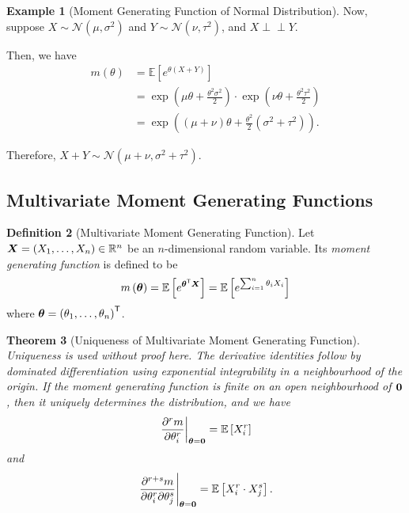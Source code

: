\documentclass[11pt]{article}
\numberwithin{equation}{section}
\newtheorem{theorem}{Theorem}[section]
\theoremstyle{definition}
\newtheorem{definition}[theorem]{Definition}
\newtheorem{example}[theorem]{Example}
\theoremstyle{remark}
\newcommand{\pqty}[1]{\left(#1\right)}
\newcommand{\bqty}[1]{\left[#1\right]}
\newcommand{\RR}{\mathbb R}
\newcommand{\transpose}{^{\mathsf T}}
\newcommand{\rightbar}[1]{\left.#1\right|}
\newcommand{\Expt}{\mathbb E}
\newcommand{\indp}{\mathrel{\perp\!\!\!\perp}}
\newcommand{\Normal}{\mathcal N}
\begin{document}
\begin{example}[Moment Generating Function of Normal Distribution]
    Now, suppose \(X \sim \Normal\pqty{\mu, \sigma^2}\) and \(Y \sim \Normal\pqty{\nu, \tau^2}\), and \(X \indp Y\).

    Then, we have
    \begin{align*}
        m\pqty{\theta} &= \Expt\bqty{e^{\theta \pqty{X + Y}}} \\
        &= \exp\pqty{\mu \theta + \frac{\theta^2 \sigma^2}{2}} \cdot \exp\pqty{\nu \theta + \frac{\theta^2 \tau^2}{2}} \\
        &= \exp\pqty{\pqty{\mu + \nu} \theta + \frac{\theta^2}{2} \pqty{\sigma^2 + \tau^2}}.
    \end{align*}

    Therefore, \(X + Y \sim \Normal\pqty{\mu + \nu, \sigma^2 + \tau^2}\).
\end{example}

\subsection{Multivariate Moment Generating Functions}

\begin{definition}[Multivariate Moment Generating Function]\label{probability-definition-065}
    \label{probability-def:multivariate-mgf}%
    Let \(\vb{X} = \pqty{X_1, \ldots, X_n} \in \RR^n\) be an \(n\)-dimensional random variable. Its \emph{moment generating function} is defined to be
    \[
        m\pqty{\vb*{\theta}} = \Expt\bqty{e^{\vb*{\theta}\transpose \vb{X}}} = \Expt\bqty{e^{\sum_{i = 1}^{n} \theta_i X_i}}
    \]
    where \(\vb*{\theta} = \pqty{\theta_1, \ldots, \theta_n} \transpose\).
\end{definition}

\begin{theorem}[Uniqueness of Multivariate Moment Generating Function]\label{probability-theorem-024}
    \label{probability-thm:uniqueness-multivarite-mgf-moments}
Uniqueness is used without proof here. The derivative identities follow by dominated differentiation using exponential integrability in a neighbourhood of the origin.
%
    If the moment generating function is finite on an open neighbourhood of \(\vb{0}\), then it uniquely determines the distribution, and we have
    \[
        \rightbar{\pdv[r]{m}{\theta_i}}_{\vb*{\theta} = \vb{0}} = \Expt\bqty{X_i^r}
    \]
    and
    \[
        \rightbar{\frac{\partial^{r + s} m}{\partial \theta_i^r \partial \theta_j^s}}_{\vb*{\theta} = \vb{0}} = \Expt\bqty{X_i^r \cdot X_j^s}.
    \]
\end{theorem}
\end{document}
